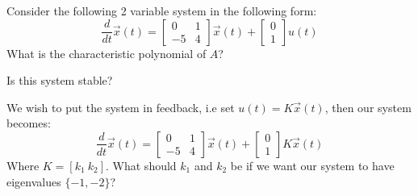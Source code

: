 
\begin{enumerate}

\qitem Consider the following 2 variable system in the following form:
$$
\frac{d}{dt}\vec{x}(t) =
\begin{bmatrix}
0 & 1 \\
-5 & 4
\end{bmatrix}
\vec{x}(t) +
\begin{bmatrix}
0 \\
1
\end{bmatrix}
u(t)
$$
What is the characteristic polynomial of $A$?





\qitem Is this system stable?



\qitem We wish to put the system in feedback, i.e set $u(t) = K\vec{x}(t)$, then our system becomes:
$$
\frac{d}{dt}\vec{x}(t) =
\begin{bmatrix}
0 & 1 \\
-5 & 4
\end{bmatrix}
\vec{x}(t) +
\begin{bmatrix}
0 \\
1
\end{bmatrix}
K
\vec{x}(t)
$$
Where $K = [k_1~k_2]$. What should $k_1$ and $k_2$ be if we want our system to have eigenvalues $\{-1, -2\}$?


\end{enumerate}

